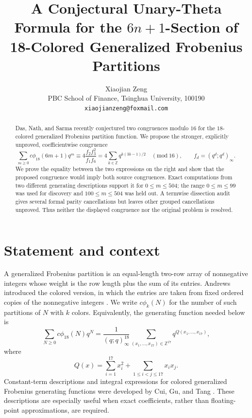 \documentclass[11pt]{article}
\title{A Conjectural Unary-Theta Formula for the $6n+1$-Section of\\
18-Colored Generalized Frobenius Partitions}
\author{Xiaojian Zeng\\
PBC School of Finance, Tsinghua University, 100190\\
\texttt{xiaojianzeng@foxmail.com}}
\date{}
\newcommand{\cphi}{c\phi}
\begin{document}
\maketitle

\begin{abstract}
Das, Nath, and Sarma recently conjectured two congruences modulo $16$ for
the $18$-colored generalized Frobenius partition function.  We propose the
stronger, explicitly unproved, coefficientwise congruence
\[
 \sum_{m\geq0}\cphi_{18}(6m+1)q^m
 \equiv 4\frac{f_2f_3^2}{f_1f_6}
 =4\sum_{k\in\mathbb Z}q^{k(3k-1)/2}\quad(\mathrm{mod}\ 16),
 \qquad f_d=(q^d;q^d)_\infty.
\]
We prove the equality between the two expressions on the right and show that
the proposed congruence would imply both source congruences.  Exact
computations from two different generating descriptions support it for
$0\leq m\leq504$; the range $0\leq m\leq99$ was used for discovery and
$100\leq m\leq504$ was held out.  A termwise dissection audit gives several
formal parity cancellations but leaves other grouped cancellations unproved.
Thus neither the displayed congruence nor the original problem is resolved.
\end{abstract}

\section{Statement and context}

A generalized Frobenius partition is an equal-length two-row array of
nonnegative integers whose weight is the row length plus the sum of its
entries.  Andrews introduced the colored version, in which the entries are
taken from fixed ordered copies of the nonnegative integers
\cite{Andrews1984GFP}.  We write \(\cphi_k(N)\) for the number of such
partitions of \(N\) with \(k\) colors.  Equivalently, the generating function
needed below is
\begin{equation}\label{eq:lattice}
 \sum_{N\geq0}\cphi_{18}(N)q^N
 =\frac{1}{(q;q)_\infty^{18}}
   \sum_{(x_1,\ldots,x_{17})\in\mathbb Z^{17}}
   q^{Q(x_1,\ldots,x_{17})},
\end{equation}
where
\[
 Q(x)=\sum_{i=1}^{17}x_i^2+
       \sum_{1\leq i<j\leq17}x_ix_j.
\]
Constant-term descriptions and integral expressions for colored generalized
Frobenius generating functions were developed by Cui, Gu, and Tang
\cite{CuiGuTang2024,CuiGuTang2025}.  These descriptions are especially useful
when exact coefficients, rather than floating-point approximations, are
required.
\end{document}
